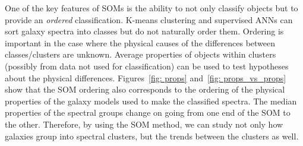        One of the key features of SOMs is the ability to not only classify objects but to provide an {\em ordered} classification.
       K-means clustering and supervised ANNs can sort galaxy spectra into classes but do not naturally order them. Ordering is important in the case where the physical causes of the differences between classes/clusters are unknown. Average properties of objects within clusters (possibly from data not used for classification) can be used to test hypotheses about the physical differences. 
       Figures~\ref{fig: props} and~\ref{fig: props_vs_props} show that the SOM ordering also corresponds to the ordering of the physical properties of the galaxy models used to make the classified spectra. 
       The median properties of the spectral groups change on going from one end of the SOM to the other.
       Therefore, by using the SOM method, we can study not only how galaxies group into spectral clusters, but the trends between the clusters as well.